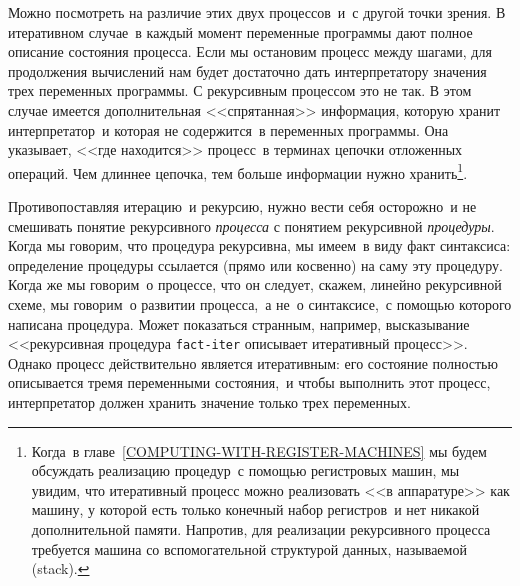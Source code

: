 Можно посмотреть на различие этих двух процессов~и~с другой 
точки зрения. В итеративном случае~в каждый момент переменные
программы дают полное описание состояния процесса.  Если мы остановим
процесс между шагами, для продолжения вычислений нам будет достаточно
дать интерпретатору значения трех переменных программы. С рекурсивным 
процессом это не так. В этом случае имеется дополнительная
<<спрятанная>> информация, которую хранит интерпретатор~и которая не
содержится~в переменных программы.  Она указывает, <<где находится>>
процесс~в терминах цепочки отложенных операций.  Чем длиннее цепочка,
тем больше информации нужно хранить\footnote{Когда~в главе~\ref{COMPUTING-WITH-REGISTER-MACHINES} мы будем
обсуждать реализацию процедур~с помощью регистровых машин, мы увидим,
что итеративный процесс можно реализовать <<в аппаратуре>> как машину, 
у которой есть только конечный набор регистров~и нет никакой
дополнительной памяти.  Напротив, для реализации рекурсивного процесса 
требуется машина со вспомогательной структурой данных,
называемой  (stack).
}.

Противопоставляя итерацию~и рекурсию, нужно вести себя
осторожно~и не смешивать понятие рекурсивного  
% 
{\em процесса}
с понятием рекурсивной {\em процедуры}.  Когда мы говорим, что
процедура рекурсивна, мы имеем~в виду факт синтаксиса:
определение процедуры ссылается (прямо или косвенно) на саму эту
процедуру.  Когда же мы говорим~о процессе, что он следует, скажем,
линейно рекурсивной схеме, мы говорим~о развитии процесса,~а не~о 
синтаксисе,~с помощью которого написана процедура.  Может показаться
странным, например, высказывание <<рекурсивная процедура
{\tt fact-iter} описывает итеративный процесс>>.  Однако процесс
действительно является итеративным: его состояние полностью
описывается тремя переменными состояния,~и чтобы выполнить этот
процесс, интерпретатор должен хранить значение только трех
переменных.

